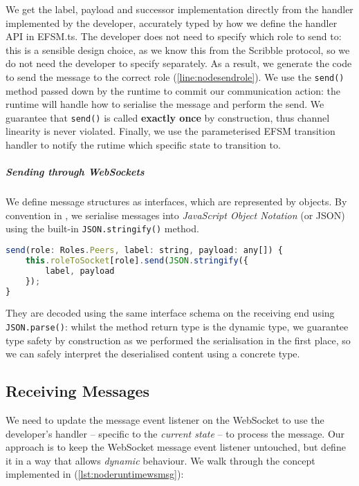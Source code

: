 We get the label, payload and successor implementation
directly from the handler implemented by the developer, 
accurately typed by how we define the handler API in EFSM.ts.
The developer does not need to specify which role
to send to: this is a sensible design choice, as we know this
from the Scribble protocol, so we do not need the developer 
to specify separately.
As a result, we generate the code to send the message
to the correct role (\cref{line:nodesendrole}).
We use the \texttt{send()} method passed down
by the runtime to commit our communication action:
the runtime will handle how to serialise the message and perform
the send. We guarantee that \texttt{send()} is called
\textbf{exactly once} by construction, thus channel linearity
is never violated.
Finally, we use the parameterised EFSM transition handler
to notify the rutime which specific state to transition to.

\subparagraph{Sending through WebSockets}
We define message structures as interfaces, which
are represented by objects. 
By convention in ,
we serialise messages into \textit{JavaScript Object Notation}
(or JSON) \cite{json} using the built-in \texttt{JSON.stringify()}
method.

\begin{lstlisting}[language=javascript]
send(role: Roles.Peers, label: string, payload: any[]) {
	this.roleToSocket[role].send(JSON.stringify({
		label, payload
	});
}
\end{lstlisting}

They are decoded using the same interface schema on the receiving end
using \texttt{JSON.parse()}: whilst the method return type is the
dynamic  type, 
we guarantee type safety by construction
as we performed the serialisation in the first place, so
we can safely interpret the deserialised content 
using a concrete type.

\subsection{Receiving Messages}
\label{subsection:noderuntimereceive}

We need to update the message event listener on the WebSocket
to use the developer's handler -- 
specific to the \textit{current state} -- 
to process the message.
Our approach is to keep the WebSocket message event listener
untouched, but define it in a way that allows \textit{dynamic} behaviour.
We walk through the concept implemented in (\cref{lst:noderuntimewsmsg}):

